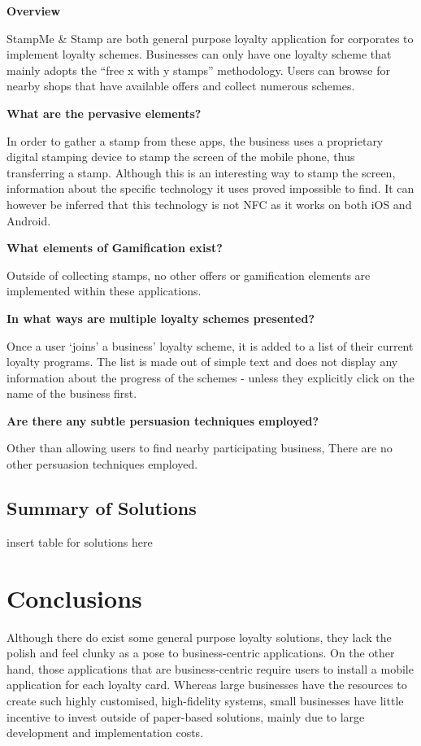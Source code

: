 \textbf{Overview}

StampMe \& Stamp are both general purpose loyalty application for corporates to implement loyalty schemes. Businesses can only have one loyalty scheme that mainly adopts the ``free x with y stamps'' methodology. Users can browse for nearby shops that have available offers and collect numerous schemes.

\textbf{What are the pervasive elements?}

In order to gather a stamp from these apps, the business uses a proprietary digital stamping device to stamp the screen of the mobile phone, thus transferring a stamp. Although this is an interesting way to stamp the screen, information about the specific technology it uses proved impossible to find. It can however be inferred that this technology is not NFC as it works on both iOS and Android.

\textbf{What elements of Gamification exist?}

Outside of collecting stamps, no other offers or gamification elements are implemented within these applications. 

\textbf{In what ways are multiple loyalty schemes presented?}

Once a user `joins' a business' loyalty scheme, it is added to a list of their current loyalty programs. The list is made out of simple text and does not display any information about the progress of the schemes - unless they explicitly click on the name of the business first.

\textbf{Are there any subtle persuasion techniques employed?}

Other than allowing users to find nearby participating business, There are no other persuasion techniques employed.

\clearpage{}
\subsection{Summary of Solutions}
insert table for solutions here
\section{Conclusions}
Although there do exist some general purpose loyalty solutions, they lack the polish and feel clunky as a pose to business-centric applications. On the other hand, those applications that are business-centric require users to install a mobile application for each loyalty card. Whereas large businesses have the resources to create such highly customised, high-fidelity systems, small businesses have little incentive to invest outside of paper-based solutions, mainly due to large development and implementation costs.

